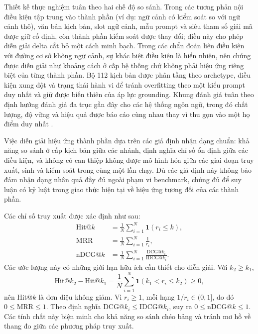 ﻿\documentclass[a4paper,12pt]{article}
\newcommand{\ind}{\mathbf{1}}
\begin{document}
Thiết kế thực nghiệm tuân theo hai chế độ so sánh. Trong các tương phản nội điều kiện tập trung vào thành phần (ví dụ: ngữ cảnh có kiểm soát so với ngữ cảnh thô), văn bản kịch bản, slot ngữ cảnh, mẫu prompt và siêu tham số giải mã được giữ cố định, còn thành phần kiểm soát được thay đổi; điều này cho phép diễn giải delta cắt bỏ một cách minh bạch. Trong các chẩn đoán liên điều kiện với đường cơ sở không ngữ cảnh, sự khác biệt điều kiện là hiển nhiên, nên chúng được diễn giải như khoảng cách ở cấp hệ thống chứ không phải hiệu ứng riêng biệt của từng thành phần. Bộ 112 kịch bản được phân tầng theo archetype, điều kiện xung đột và trạng thái hành vi để tránh overfitting theo một kiểu prompt duy nhất và giữ được biến thiên của áp lực grounding. Khung đánh giá tuân theo định hướng đánh giá đa trục gần đây cho các hệ thống ngôn ngữ, trong đó chất lượng, độ vững và hiệu quả được báo cáo cùng nhau thay vì thu gọn vào một họ điểm duy nhất \cite{Liang2023HELM}.

Việc diễn giải hiệu ứng thành phần dựa trên các giả định nhận dạng chuẩn: khả năng so sánh ở cấp kịch bản giữa các nhánh, định nghĩa chỉ số ổn định giữa các điều kiện, và không có can thiệp không được mô hình hóa giữa các giai đoạn truy xuất, sinh và kiểm soát trong cùng một lần chạy. Dù các giả định này không bảo đảm nhận dạng nhân quả đầy đủ ngoài phạm vi benchmark, chúng đủ để suy luận có kỷ luật trong giao thức hiện tại về hiệu ứng tương đối của các thành phần.

Các chỉ số truy xuất được xác định như sau:
\begin{align}
\mathrm{Hit@}k &= \frac{1}{N}\sum_{i=1}^{N}\ind\!\left(r_i\le k\right),\\
\mathrm{MRR} &= \frac{1}{N}\sum_{i=1}^{N}\frac{1}{r_i},\\
\mathrm{nDCG@}k &= \frac{1}{N}\sum_{i=1}^{N}\frac{\mathrm{DCG@}k_i}{\mathrm{IDCG@}k_i}.
\end{align}
Các ước lượng này có những giới hạn hữu ích cần thiết cho diễn giải. Với \(k_2\ge k_1\),
\begin{equation}
\mathrm{Hit@}k_2-\mathrm{Hit@}k_1
=\frac{1}{N}\sum_{i=1}^{N}\ind(k_1<r_i\le k_2)\ge0,
\end{equation}
nên Hit@\(k\) là đơn điệu không giảm. Vì \(r_i\ge1\), mỗi hạng \(1/r_i\in(0,1]\), do đó \(0\le\mathrm{MRR}\le1\). Theo định nghĩa \(\mathrm{DCG@}k_i\le\mathrm{IDCG@}k_i\), suy ra \(0\le\mathrm{nDCG@}k\le1\). Các tính chất này biện minh cho khả năng so sánh chéo bảng và tránh mơ hồ về thang đo giữa các phương pháp truy xuất.
\end{document}
